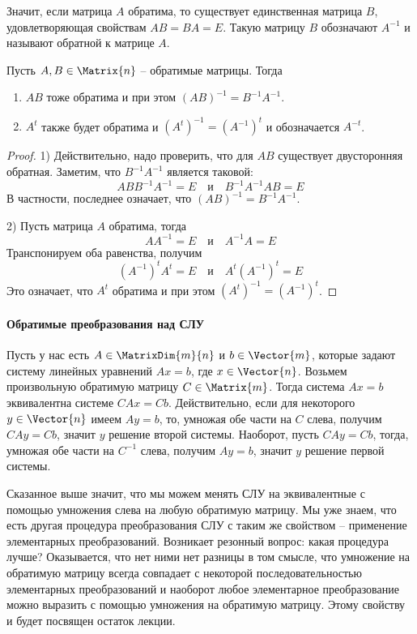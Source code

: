 Значит, если матрица $A$ обратима, то существует единственная матрица $B$, удовлетворяющая свойствам $AB = BA = E$.
Такую матрицу $B$ обозначают $A^{-1}$ и называют обратной к матрице $A$. 

\begin{claim*}
Пусть $A, B\in \Matrix{n}$ -- обратимые матрицы.
Тогда 
\begin{enumerate}
\item $AB$ тоже обратима и при этом $(AB)^{-1} = B^{-1}A^{-1}$.
\item  $A^t$ также будет обратима и $(A^t)^{-1} = (A^{-1})^t$ и обозначается $A^{-t}$.
\end{enumerate}
\end{claim*}
\begin{proof}
1) Действительно, надо проверить, что для $AB$ существует двусторонняя обратная.
Заметим, что $B^{-1}A^{-1}$ является таковой:
\[
AB B^{-1}A^{-1} = E \quad\text{и}\quad B^{-1}A^{-1} AB = E
\]
В частности, последнее означает, что $(AB)^{-1} = B^{-1}A^{-1}$.

2) Пусть матрица $A$ обратима, тогда
\[
A A^{-1} = E\quad \text{и}\quad A^{-1}A = E
\]
Транспонируем оба равенства, получим
\[
(A^{-1})^t A^t = E\quad \text{и}\quad A^t (A^{-1})^t = E
\]
Это означает, что $A^t$ обратима и при этом $(A^t)^{-1} = (A^{-1})^t$.
\end{proof}

\paragraph{Обратимые преобразования над СЛУ} 
Пусть у нас есть $A\in\MatrixDim{m}{n}$ и $b\in \Vector{m}$, которые задают систему линейных уравнений $Ax = b$, где $x\in \Vector{n}$.
Возьмем произвольную обратимую матрицу $C\in\Matrix{m}$.
Тогда система $Ax = b$ эквивалентна системе $CAx = Cb$.
Действительно, если для некоторого $y\in\Vector{n}$ имеем $Ay = b$, то, умножая обе части на $C$ слева, получим $CAy = Cb$, значит $y$ решение второй системы.
Наоборот, пусть $CA y = Cb$, тогда, умножая обе части на $C^{-1}$ слева, получим $Ay =b$, значит $y$ решение первой системы.

Сказанное выше значит, что мы можем менять СЛУ на эквивалентные с помощью умножения слева на любую обратимую матрицу.
Мы уже знаем, что есть другая процедура преобразования СЛУ с таким же свойством -- применение элементарных преобразований.
Возникает резонный вопрос: какая процедура лучше?
Оказывается, что нет ними нет разницы в том смысле, что умножение на обратимую матрицу всегда совпадает с некоторой последовательностью элементарных преобразований и наоборот любое элементарное преобразование можно выразить с помощью умножения на обратимую матрицу.
Этому свойству и будет посвящен остаток лекции.

